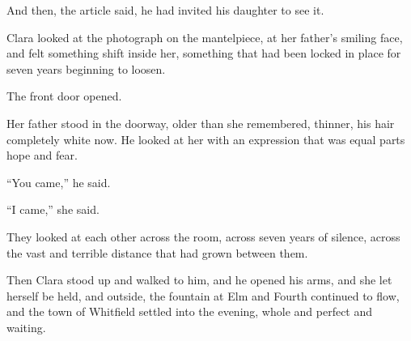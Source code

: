 \documentclass[
    language=english,
    doctype=short-story,
    institution=none,
]{../../omnilatex}
\begin{document}
And then, the article said, he had invited his daughter to see it.

Clara looked at the photograph on the mantelpiece, at her father's smiling face, and felt something shift inside her, something that had been locked in place for seven years beginning to loosen.

The front door opened.

Her father stood in the doorway, older than she remembered, thinner, his hair completely white now. He looked at her with an expression that was equal parts hope and fear.

``You came,'' he said.

``I came,'' she said.

They looked at each other across the room, across seven years of silence, across the vast and terrible distance that had grown between them.

Then Clara stood up and walked to him, and he opened his arms, and she let herself be held, and outside, the fountain at Elm and Fourth continued to flow, and the town of Whitfield settled into the evening, whole and perfect and waiting.
\end{document}
